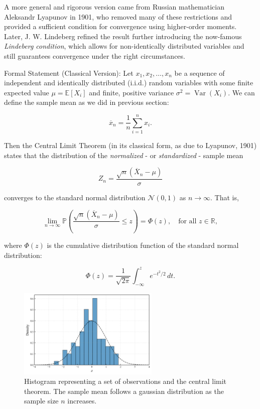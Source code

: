 \documentclass{book}
\begin{document}
A more general and rigorous version came from Russian mathematician Aleksandr Lyapunov in 1901, who removed many of these restrictions and provided a sufficient condition for convergence using higher-order moments. Later, J. W. Lindeberg refined the result further introducing the now-famous \textit{Lindeberg condition}, which allows for non-identically distributed variables and still guarantees convergence under the right circumstances.

Formal Statement (Classical Version): Let $x_1, x_2, \dots, x_n$ be a sequence of independent and identically distributed (i.i.d.) random variables with some finite expected value $\mu = \mathbb{E}[X_i]$ and finite, positive variance $\sigma^2 = \operatorname{Var}(X_i)$. We can define the sample mean as we did in previous section:

\begin{equation}
	\overline{x}_n = \frac{1}{n} \sum_{i=1}^n x_i.
\end{equation}

Then the Central Limit Theorem (in its classical form, as due to Lyapunov, 1901) states that the distribution of the \textit{normalized} - or \textit{standardized} - sample mean

\begin{equation}
	Z_n = \frac{\sqrt{n}(\overline{X}_n - \mu)}{\sigma}
\end{equation}

converges to the standard normal distribution $\mathcal{N}(0,1)$ as $n \to \infty$. That is,

\begin{equation}
	\lim_{n \to \infty} \mathbb{P}\left( \frac{\sqrt{n}(\overline{X}_n - \mu)}{\sigma} \leq z \right) = \Phi(z), \quad \text{for all } z \in \mathbb{R},
\end{equation}

where \( \Phi(z) \) is the cumulative distribution function of the standard normal distribution:

\begin{equation}
	\Phi(z) = \frac{1}{\sqrt{2\pi}} \int_{-\infty}^z e^{-t^2/2} \, dt.
\end{equation}

\begin{figure}[ht]
    \centering
    \includegraphics[width=0.6\textwidth]{figures/chapter3/clt_2.png}
    \caption{Histogram representing a set of observations and the central limit theorem. The sample mean follows a gaussian distribution as the sample size $n$ increases.}
    \label{fig:random}
\end{figure}
\end{document}
